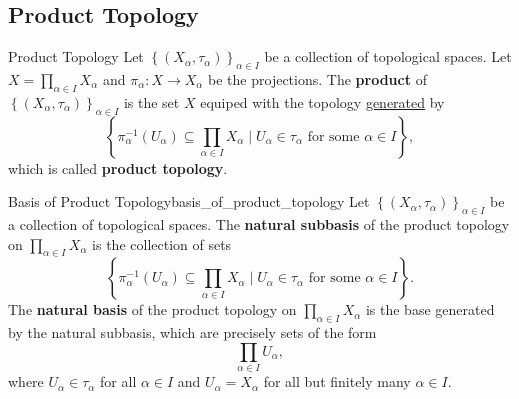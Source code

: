 \documentclass{report}
\begin{document}
\subsection{Product Topology}
\begin{definition}{Product Topology}{}
	Let $\left\{(X_\alpha,\tau_\alpha)\right\}_{\alpha\in I}$ be a collection of topological spaces. Let $X=\prod_{\alpha\in I}X_\alpha$ and $\pi_\alpha:X\to X_\alpha$ be the projections. The \textbf{product} of $\left\{(X_\alpha,\tau_\alpha)\right\}_{\alpha\in I}$ is the set $X$ equiped with the topology \hyperref[th:generated_topology]{generated} by
	\[
		\left\{\pi_\alpha^{-1}(U_\alpha)\subseteq\prod_{\alpha\in I}X_\alpha\mid U_\alpha\in \tau_\alpha\text{ for some }\alpha\in I\right\},
	\]
	which is called \textbf{product topology}.
\end{definition}

\begin{definition}{Basis of Product Topology}{basis_of_product_topology}
	Let $\left\{(X_\alpha,\tau_\alpha)\right\}_{\alpha\in I}$ be a collection of topological spaces. The \textbf{natural subbasis} of the product topology on $\prod_{\alpha\in I}X_\alpha$ is the collection of sets 
	\[
		\left\{\pi_\alpha^{-1}(U_\alpha)\subseteq\prod_{\alpha\in I}X_\alpha\mid U_\alpha\in \tau_\alpha\text{ for some }\alpha\in I\right\}.
	\]
	The \textbf{natural basis} of the product topology on $\prod_{\alpha\in I}X_\alpha$ is the base generated by the natural subbasis, which are precisely sets of the form
	\[
		\prod_{\alpha\in I}U_\alpha,
	\]
	where $U_\alpha\in \tau_\alpha$ for all $\alpha\in I$ and $U_\alpha=X_\alpha$ for all but finitely many $\alpha\in I$.
\end{definition}
\end{document}
